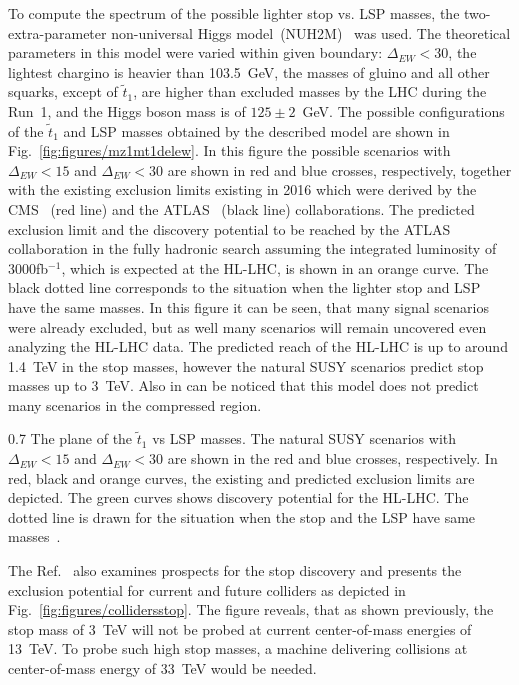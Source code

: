 To compute the spectrum of the possible lighter stop vs. LSP masses, the two-extra-parameter non-universal Higgs model~(NUH2M)~\cite{Matalliotakis:1994ft, Nath:1997qm, Ellis:2002iu, Baer:2005bu} was used. The theoretical parameters in this model were varied within given boundary: $\Delta_{EW} <30$, the lightest chargino is heavier than 103.5~GeV, the masses of gluino and all other squarks,  except of $\tilde{t}_{1}$, are higher than excluded masses by the LHC during the Run~1, and the Higgs boson mass is of $125 \pm 2$~GeV. The possible configurations of the $\tilde{t}_{1}$ and LSP masses obtained by the described model are shown in Fig.~\ref{fig:figures/mz1mt1delew}. In this figure the possible scenarios with $\Delta_{EW} <15$ and $\Delta_{EW} <30$ are shown in red and blue crosses, respectively, together with the existing exclusion limits existing in 2016 which were derived by the CMS~\cite{CMS:2016hxa} (red line) and the ATLAS~\cite{ATLAS:2016jaa, ATLAS:2016ljb, ATLAS:2016xcm, Aaboud:2016tnv} (black line) collaborations. The predicted exclusion limit and the discovery potential to be reached by the ATLAS collaboration in the fully hadronic search assuming the integrated luminosity of $3000$fb$^{-1}$, which is expected at the HL-LHC, is shown in an orange curve. The black dotted line corresponds to the situation when the lighter stop and LSP have the same masses. In this figure it can be seen, that many signal scenarios were already excluded, but as well many scenarios will remain uncovered even analyzing the HL-LHC data. The predicted reach of the HL-LHC is up to around 1.4~TeV in the stop masses, however the natural SUSY scenarios predict stop masses up to 3~TeV. Also in can be noticed that this model does not predict many scenarios in the compressed region.  

                 {0.7}       %
                 { The plane of the $\tilde{t}_{1}$ vs LSP masses. The natural SUSY scenarios with $\Delta_{EW} <15$ and $\Delta_{EW} <30$ are shown in the red and blue crosses, respectively. In red, black and orange curves, the existing and predicted exclusion limits are depicted. The green curves shows discovery potential for the HL-LHC. The dotted line is drawn for the situation when the stop and the LSP have same masses~\cite{Baer:2016bwh}.   }

The Ref.~\cite{Baer:2016bwh} also examines prospects for the stop discovery and presents the exclusion potential for current and future colliders as depicted in Fig.~\ref{fig:figures/collidersstop}. The figure reveals, that as shown previously, the stop mass of 3~TeV will not be probed at current center-of-mass energies of 13~TeV. To probe such high stop masses, a machine delivering collisions at center-of-mass energy of 33~TeV would be needed. 

